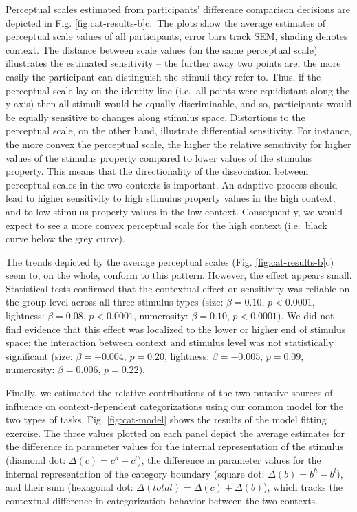 \documentclass[a4paper, nobind]{templates/ociamthesis}
\begin{document}
Perceptual scales estimated from participants' difference comparison decisions are depicted in Fig. \ref{fig:cat-results-b}c.~The plots show the average estimates of perceptual scale values of all participants, error bars track SEM, shading denotes context. The distance between scale values (on the same perceptual scale) illustrates the estimated sensitivity -- the further away two points are, the more easily the participant can distinguish the stimuli they refer to. Thus, if the perceptual scale lay on the identity line (i.e.~all points were equidistant along the y-axis) then all stimuli would be equally discriminable, and so, participants would be equally sensitive to changes along stimulus space. Distortions to the perceptual scale, on the other hand, illustrate differential sensitivity. For instance, the more convex the perceptual scale, the higher the relative sensitivity for higher values of the stimulus property compared to lower values of the stimulus property. This means that the directionality of the dissociation between perceptual scales in the two contexts is important. An adaptive process should lead to higher sensitivity to high stimulus property values in the high context, and to low stimulus property values in the low context. Consequently, we would expect to see a more convex perceptual scale for the high context (i.e.~black curve below the grey curve).

The trends depicted by the average perceptual scales (Fig. \ref{fig:cat-results-b}c) seem to, on the whole, conform to this pattern. However, the effect appears small. Statistical tests confirmed that the contextual effect on sensitivity was reliable on the group level across all three stimulus types (size: \(\beta=0.10\), \(p<0.0001\), lightness: \(\beta=0.08\), \(p<0.0001\), numerosity: \(\beta=0.10\), \(p<0.0001\)). We did not find evidence that this effect was localized to the lower or higher end of stimulus space; the interaction between context and stimulus level was not statistically significant (size: \(\beta=-0.004\), \(p=0.20\), lightness: \(\beta=-0.005\), \(p=0.09\), numerosity: \(\beta=0.006\), \(p=0.22\)).

Finally, we estimated the relative contributions of the two putative sources of influence on context-dependent categorizations using our common model for the two types of tasks. Fig. \ref{fig:cat-model} shows the results of the model fitting exercise. The three values plotted on each panel depict the average estimates for the difference in parameter values for the internal representation of the stimulus (diamond dot: \(\Delta(c) = c^h - c^l\)), the difference in parameter values for the internal representation of the category boundary (square dot: \(\Delta(b) = b^h - b^l\)), and their sum (hexagonal dot: \(\Delta(total) = \Delta(c) + \Delta(b)\)), which tracks the contextual difference in categorization behavior between the two contexts.
\end{document}
